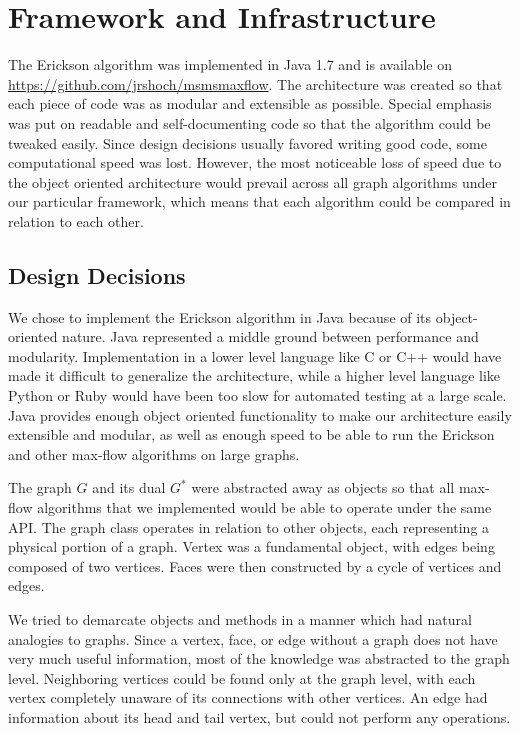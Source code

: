 \documentclass[12pt]{article}
\begin{document}
\section{Framework and Infrastructure}

The Erickson algorithm was implemented in Java 1.7 and is available on \url{https://github.com/jrshoch/msmsmaxflow}. The architecture was created so that each piece of code was as modular and extensible as possible. Special emphasis was put on readable and self-documenting code so that the algorithm could be tweaked easily. Since design decisions usually favored writing good code, some computational speed was lost. However, the most noticeable loss of speed due to the object oriented architecture would prevail across all graph algorithms under our particular framework, which means that each algorithm could be compared in relation to each other.

\subsection{Design Decisions}

We chose to implement the Erickson algorithm in Java because of its object-oriented nature. Java represented a middle ground between performance and modularity. Implementation in a lower level language like C or C++ would have made it difficult to generalize the architecture, while a higher level language like Python or Ruby would have been too slow for automated testing at a large scale. Java provides enough object oriented functionality to make our architecture easily extensible and modular, as well as enough speed to be able to run the Erickson and other max-flow algorithms on large graphs.

The graph $G$ and its dual $G^*$ were abstracted away as objects so that all max-flow algorithms that we implemented would be able to operate under the same API. The graph class operates in relation to other objects, each representing a physical portion of a graph. Vertex was a fundamental object, with edges being composed of two vertices. Faces were then constructed by a cycle of vertices and edges. 

We tried to demarcate objects and methods in a manner which had natural analogies to graphs. Since a vertex, face, or edge without a graph does not have very much useful information, most of the knowledge was abstracted to the graph level. Neighboring vertices could be found only at the graph level, with each vertex completely unaware of its connections with other vertices. An edge had information about its head and tail vertex, but could not perform any operations.
\end{document}
